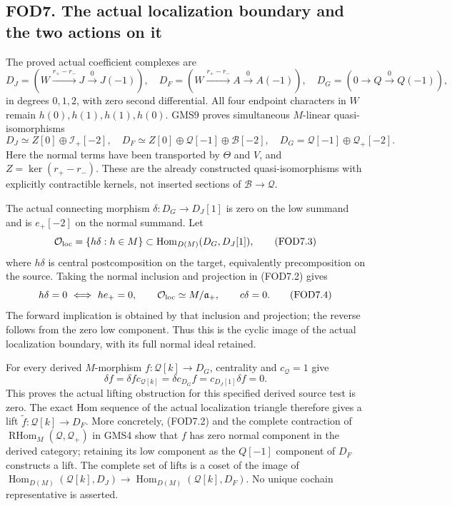 \subsection{FOD7. The actual localization boundary and the two actions
on
it}\label{fod7.-the-actual-localization-boundary-and-the-two-actions-on-it}

The proved actual coefficient complexes are \[
D_J=(W\xrightarrow{r_+-r_-} J\xrightarrow{0}J(-1)),\quad
D_F=(W\xrightarrow{r_+-r_-} A\xrightarrow{0}A(-1)),\quad
D_G=(0\to Q\xrightarrow{0}Q(-1)),
\tag{FOD7.1}
\] in degrees \(0,1,2\), with zero second differential. All four
endpoint characters in \(W\) remain \(h(0),h(1),h(1),h(0)\). GMS9 proves
simultaneous \(M\)-linear quasi-isomorphisms \[
D_J\simeq Z[0]\oplus\mathcal I_+[-2],\quad
D_F\simeq Z[0]\oplus\mathcal Q[-1]\oplus\mathcal B[-2],\quad
D_G=\mathcal Q[-1]\oplus\mathcal Q_+[-2].
\tag{FOD7.2}
\] Here the normal terms have been transported by \(\Theta\) and \(V\),
and \(Z=\ker(r_+-r_-)\). These are the already constructed
quasi-isomorphisms with explicitly contractible kernels, not inserted
sections of \(\mathcal B\to\mathcal Q\).

The actual connecting morphism \(\delta:D_G\to D_J[1]\) is zero on the
low summand and is \(e_+[-2]\) on the normal summand. Let \[
\mathcal O_{\rm loc}
=\{h\delta:h\in M\}
\subset\operatorname{Hom}_{D(M)}(D_G,D_J[1]),
\tag{FOD7.3}
\] where \(h\delta\) is central postcomposition on the target,
equivalently precomposition on the source. Taking the normal inclusion
and projection in (FOD7.2) gives \[
h\delta=0\ \Longleftrightarrow\ h e_+=0,\qquad
\mathcal O_{\rm loc}\simeq M/\mathfrak a_+,\qquad c\delta=0.
\tag{FOD7.4}
\] The forward implication is obtained by that inclusion and projection;
the reverse follows from the zero low component. Thus this is the cyclic
image of the actual localization boundary, with its full normal ideal
retained.

For every derived \(M\)-morphism \(f:\mathcal Q[k]\to D_G\), centrality
and \(c_{\mathcal Q}=1\) give \[
\delta f=\delta f c_{\mathcal Q[k]}
=\delta c_{D_G}f=c_{D_J[1]}\delta f=0.
\tag{FOD7.5}
\] This proves the actual lifting obstruction for this specified derived
source test is zero. The exact Hom sequence of the actual localization
triangle therefore gives a lift \(\widetilde f:\mathcal Q[k]\to D_F\).
More concretely, (FOD7.2) and the complete contraction of
\(\operatorname{RHom}_M(\mathcal Q,\mathcal Q_+)\) in GMS4 show that
\(f\) has zero normal component in the derived category; retaining its
low component as the \(Q[-1]\) component of \(D_F\) constructs a lift.
The complete set of lifts is a coset of the image of
\(\operatorname{Hom}_{D(M)}(\mathcal Q[k],D_J)\to\operatorname{Hom}_{D(M)}(\mathcal Q[k],D_F)\).
No unique cochain representative is asserted.

